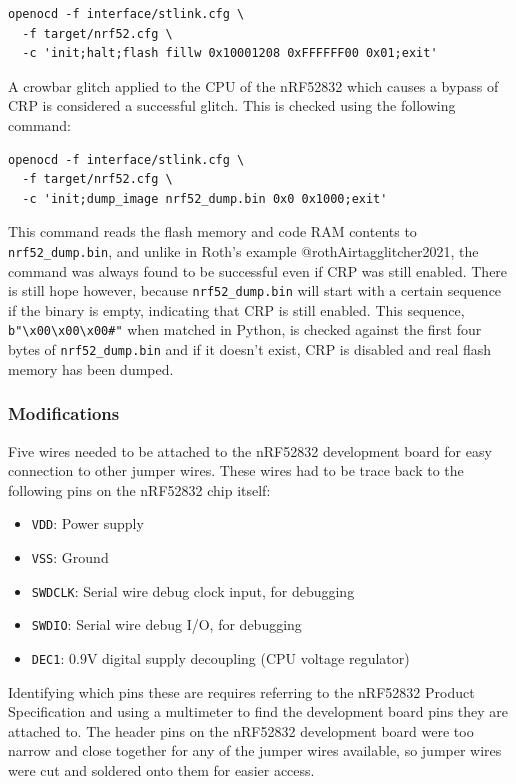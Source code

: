 \begin{verbatim}
openocd -f interface/stlink.cfg \
  -f target/nrf52.cfg \
  -c 'init;halt;flash fillw 0x10001208 0xFFFFFF00 0x01;exit'
\end{verbatim}

A crowbar glitch applied to the CPU of the nRF52832 which causes a
bypass of CRP is considered a successful glitch. This is checked using
the following command:

\begin{verbatim}
openocd -f interface/stlink.cfg \
  -f target/nrf52.cfg \
  -c 'init;dump_image nrf52_dump.bin 0x0 0x1000;exit'
\end{verbatim}

This command reads the flash memory and code RAM contents to
\texttt{nrf52\_dump.bin}, and unlike in Roth's example
@rothAirtagglitcher2021, the command was always found to be successful
even if CRP was still enabled. There is still hope however, because
\texttt{nrf52\_dump.bin} will start with a certain sequence if the
binary is empty, indicating that CRP is still enabled. This sequence,
\texttt{b"\textbackslash{}x00\textbackslash{}x00\textbackslash{}x00\#"}
when matched in Python, is checked against the first four bytes of
\texttt{nrf52\_dump.bin} and if it doesn't exist, CRP is disabled and
real flash memory has been dumped.

\hypertarget{modifications}{%
\subsubsection{Modifications}\label{modifications}}

Five wires needed to be attached to the nRF52832 development board for
easy connection to other jumper wires. These wires had to be trace back
to the following pins on the nRF52832 chip itself:

\begin{itemize}
\tightlist
\item
  \texttt{VDD}: Power supply
\item
  \texttt{VSS}: Ground
\item
  \texttt{SWDCLK}: Serial wire debug clock input, for debugging
\item
  \texttt{SWDIO}: Serial wire debug I/O, for debugging
\item
  \texttt{DEC1}: \(0.9\si{\volt}\) digital supply decoupling (CPU
  voltage regulator)
\end{itemize}

Identifying which pins these are requires referring to the nRF52832
Product Specification and using a multimeter to find the development
board pins they are attached to. The header pins on the nRF52832
development board were too narrow and close together for any of the
jumper wires available, so jumper wires were cut and soldered onto them
for easier access.

